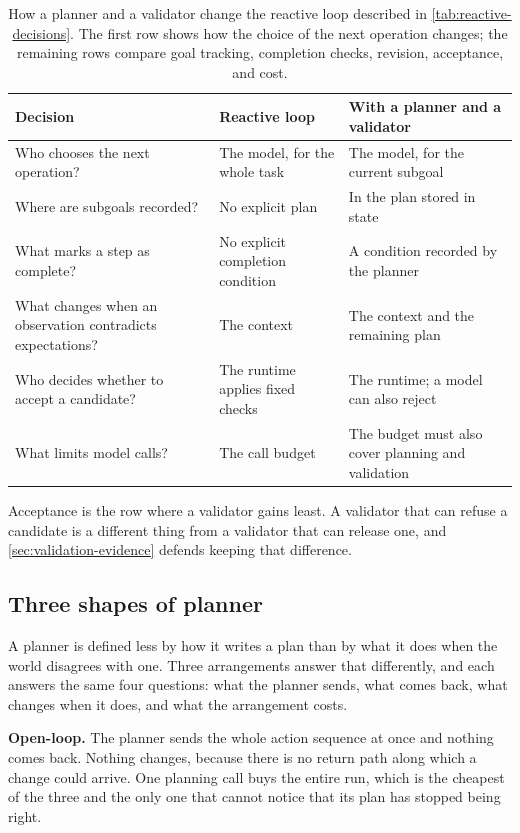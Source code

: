 \begin{table}[htbp]
  \caption{How a planner and a validator change the reactive loop described in
  \cref{tab:reactive-decisions}. The first row shows how the choice of the next operation changes;
  the remaining rows compare goal tracking, completion checks, revision, acceptance, and cost.}
  \label{tab:planning-decisions}
  \small
  \begin{tabularx}{\linewidth}{Xll}
    \toprule
    Decision & Reactive loop & With a planner and a validator \\
    \midrule
    Who chooses the next operation? & The model, for the whole task & The model, for the current subgoal \\
    \midrule
    Where are subgoals recorded? & No explicit plan & In the plan stored in state \\
    What marks a step as complete? & No explicit completion condition & A condition recorded by the planner \\
    What changes when an observation contradicts expectations? & The context & The context and the remaining plan \\
    Who decides whether to accept a candidate? & The runtime applies fixed checks & The runtime; a model can also reject \\
    What limits model calls? & The call budget & The budget must also cover planning and validation \\
    \bottomrule
  \end{tabularx}
\end{table}

Acceptance is the row where a validator gains least. A validator that can refuse a candidate is a
different thing from a validator that can release one, and \cref{sec:validation-evidence} defends
keeping that difference.

\subsection{Three shapes of planner}
\label{sec:planning-shapes}

A planner is defined less by how it writes a plan than by what it does when the world disagrees with
one. Three arrangements answer that differently, and each answers the same four questions: what the
planner sends, what comes back, what changes when it does, and what the arrangement costs.

\bi

\item \textbf{Open-loop.} The planner sends the whole action sequence at once and nothing comes
back. Nothing changes, because there is no return path along which a change could arrive. One
planning call buys the entire run, which is the cheapest of the three and the only one that cannot
notice that its plan has stopped being right.

